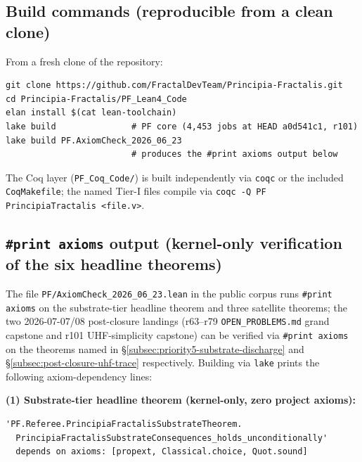 \documentclass[11pt,a4paper]{amsart}
\theoremstyle{plain}
\theoremstyle{definition}
\begin{document}
\subsection{Build commands (reproducible from a clean clone)}\label{subsec:repro-build}

From a fresh clone of the repository:

\begin{verbatim}
git clone https://github.com/FractalDevTeam/Principia-Fractalis.git
cd Principia-Fractalis/PF_Lean4_Code
elan install $(cat lean-toolchain)
lake build               # PF core (4,453 jobs at HEAD a0d541c1, r101)
lake build PF.AxiomCheck_2026_06_23
                         # produces the #print axioms output below
\end{verbatim}

The Coq layer (\texttt{PF\_Coq\_Code/}) is built independently via \texttt{coqc} or the included \texttt{CoqMakefile}; the named Tier-I files compile via \texttt{coqc -Q PF PrincipiaTractalis <file.v>}.

\subsection{\texttt{\#print axioms} output (kernel-only verification of the six headline theorems)}\label{subsec:repro-axioms}

The file \texttt{PF/AxiomCheck\_2026\_06\_23.lean} in the public corpus runs \texttt{\#print axioms} on the substrate-tier headline theorem and three satellite theorems; the two 2026-07-07/08 post-closure landings (r63--r79 \texttt{OPEN\_PROBLEMS.md} grand capstone and r101 UHF-simplicity capstone) can be verified via \texttt{\#print axioms} on the theorems named in \S\ref{subsec:priority5-substrate-discharge} and \S\ref{subsec:post-closure-uhf-trace} respectively. Building via \texttt{lake} prints the following axiom-dependency lines:

\smallskip
\textbf{(1) Substrate-tier headline theorem (kernel-only, zero project axioms):}
\begin{verbatim}
'PF.Referee.PrincipiaFractalisSubstrateTheorem.
  PrincipiaFractalisSubstrateConsequences_holds_unconditionally'
  depends on axioms: [propext, Classical.choice, Quot.sound]
\end{verbatim}
\end{document}
